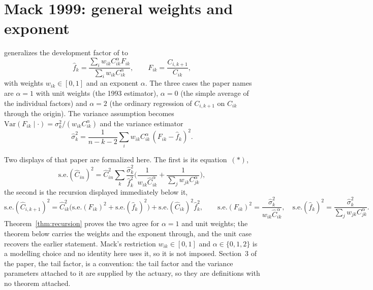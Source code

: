 
\chapter{Mack 1999: general weights and exponent}

\cite{Mack1999} generalizes the development factor of \cite{Mack1993} to
\[
  \hat f_k
   = \frac{\sum_i w_{ik} C_{ik}^{\alpha} F_{ik}}{\sum_i w_{ik} C_{ik}^{\alpha}},
  \qquad F_{ik} = \frac{C_{i,k+1}}{C_{ik}},
\]
with weights $w_{ik} \in [0,1]$ and an exponent $\alpha$. The three cases the paper names
are $\alpha = 1$ with unit weights (the 1993 estimator), $\alpha = 0$ (the simple average of
the individual factors) and $\alpha = 2$ (the ordinary regression of $C_{i,k+1}$ on $C_{ik}$
through the origin). The variance assumption becomes
$\mathrm{Var}(F_{ik} \mid \cdot) = \sigma_k^2/(w_{ik} C_{ik}^{\alpha})$ and the variance
estimator
\[
  \hat\sigma_k^2 = \frac{1}{n-k-2}\sum_i w_{ik} C_{ik}^{\alpha}\,(F_{ik} - \hat f_k)^2 .
\]

Two displays of that paper are formalized here. The first is its equation~$(*)$,
\[
  \mathrm{s.e.}(\hat C_{in})^2
   = \hat C_{in}^2 \sum_{k} \frac{\hat\sigma_k^2}{\hat f_k^2}
     \Big( \frac{1}{w_{ik}\hat C_{ik}^{\alpha}} + \frac{1}{\sum_j w_{jk} C_{jk}^{\alpha}} \Big),
\]
the second is the recursion displayed immediately below it,
\[
  \mathrm{s.e.}(\hat C_{i,k+1})^2
   = \hat C_{ik}^2\big(\mathrm{s.e.}(F_{ik})^2 + \mathrm{s.e.}(\hat f_k)^2\big)
     + \mathrm{s.e.}(\hat C_{ik})^2 \hat f_k^2,
  \qquad
  \mathrm{s.e.}(F_{ik})^2 = \frac{\hat\sigma_k^2}{w_{ik}\hat C_{ik}^{\alpha}},
  \quad
  \mathrm{s.e.}(\hat f_k)^2 = \frac{\hat\sigma_k^2}{\sum_j w_{jk} C_{jk}^{\alpha}} .
\]
Theorem~\ref{thm:recursion} proves the two agree for $\alpha = 1$ and unit weights; the
theorem below carries the weights and the exponent through, and the unit case recovers the
earlier statement. Mack's restriction $w_{ik} \in [0,1]$ and $\alpha \in \{0,1,2\}$ is a
modelling choice and no identity here uses it, so it is not imposed. Section~3 of the paper,
the tail factor, is a convention: the tail factor and the variance parameters attached to it
are supplied by the actuary, so they are definitions with no theorem attached.

